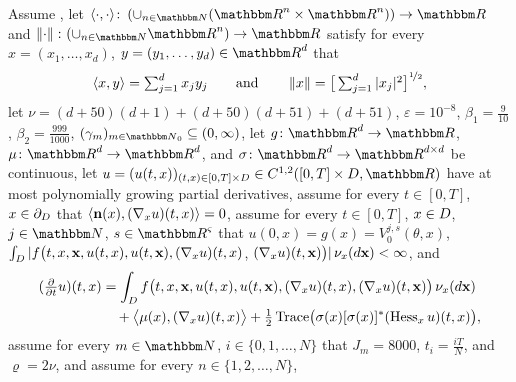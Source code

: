 \begin{algo}
	\label{frame:adam}
	Assume , let
	$\langle\cdot,\cdot \rangle \colon \left( \cup_{n\in\N} (\R^n \times \R^n)\right) \to \R$
	and
	$\norm{\cdot} \colon \allowbreak (\cup_{n\in\N} \R^n) \to \R$
	satisfy for every
	$ x = ( x_1, \dots, x_{d} )$,
	$y = (y_1,\dots,y_d) \in \R^{d} $
	that
	\begin{equation}
		\langle x,y\rangle  = \textstyle\sum\nolimits_{j=1}^d x_j y_j
					\qquad \text{and} \qquad 
		\left\| x \right\| = \big[\textstyle\sum\nolimits_{j=1}^d \vert x_j\vert^2\big]^{\nicefrac{1}{2}},
	\end{equation}
	let
	$\nu=(d+50)(d+1)+ (d+50)(d+51)+(d+51)$,
	$\varepsilon=10^{-8}$,
	$\beta_1 = \tfrac{9}{10}$,
	$\beta_2 = \tfrac{999}{1000}$,
	$(\gamma_m)_{m\in\N_0}\subseteq (0,\infty)$,
	let
	$g\colon \R^d \to \R$,
	$\mu\colon \R^d\to\R^d$, and
	$\sigma\colon \R^d\to\R^{d\times d}$
	be continuous,
	let %
	$u=(u(t,x))_{(t,x) \in [0,T]\times \D} \in C^{1,2}([0,T]\times \D,\R)$
	have at most polynomially growing partial derivatives, 
	assume for every
	$t\in [0,T]$,
	$x\in \partial_D$
	that
	$ \left<{\textbf n}(x) ,(\nabla_x u)(t,x)\right> = 0$,
	assume for every
	$t\in [0,T]$,
	$x\in D$,
	$j \in \N$,
	$s \in \R^\varsigma$
	that
	$u(0,x)=g(x) = V^{ j, s }_0( \theta, x )$,
	$\int_D |f\big(t,x,{\textbf x}, u(t,x),u(t,{\textbf x}), ( \nabla_x u )(t,x )$,
	$( \nabla_x u )(t,{\textbf x} ) \big) | \, \nu_x(d{\textbf x}) < \infty$,
	and
	\begin{equation}
	\begin{split}
	\label{eq:PDE-Examples}
	(\tfrac{\partial}{\partial t}u)(t,x)
	&=
	\int_{D} f\big(t,x,{\textbf x}, u(t,x),u(t,{\textbf x}), ( \nabla_x u )(t,x ),( \nabla_x u )(t,{\textbf x} ) \big) \, \nu_x(d{\textbf x}) \\
	& \quad + \big\langle \mu(x), ( \nabla_x u )( t,x ) \big\rangle
	+ \tfrac{ 1 }{ 2 }
	\operatorname{Trace}\!\big(
	\sigma(x) [ \sigma(x) ]^*
	( \operatorname{Hess}_x u)( t,x )
	\big),
	\end{split}
	\end{equation}
	assume for every
	$m\in\N$,
	$i\in\{0,1,\ldots,N\} $ 
	that
	$ J_m = 8000$,
	$ t_i = \tfrac{iT}{N} $,
	and
	$ \varrho = 2 \nu $,
	and assume for every
	$n \in \{1,2,\dots,N\}$,

\end{algo}

